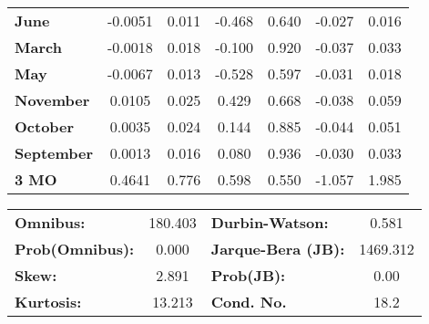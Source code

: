 \begin{center}
\begin{tabular}{lcccccc}
\textbf{June}      &      -0.0051  &        0.011     &    -0.468  &         0.640        &       -0.027    &        0.016     \\
\textbf{March}     &      -0.0018  &        0.018     &    -0.100  &         0.920        &       -0.037    &        0.033     \\
\textbf{May}       &      -0.0067  &        0.013     &    -0.528  &         0.597        &       -0.031    &        0.018     \\
\textbf{November}  &       0.0105  &        0.025     &     0.429  &         0.668        &       -0.038    &        0.059     \\
\textbf{October}   &       0.0035  &        0.024     &     0.144  &         0.885        &       -0.044    &        0.051     \\
\textbf{September} &       0.0013  &        0.016     &     0.080  &         0.936        &       -0.030    &        0.033     \\
\textbf{3 MO}      &       0.4641  &        0.776     &     0.598  &         0.550        &       -1.057    &        1.985     \\
\bottomrule
\end{tabular}
\begin{tabular}{lclc}
\textbf{Omnibus:}       & 180.403 & \textbf{  Durbin-Watson:     } &    0.581  \\
\textbf{Prob(Omnibus):} &   0.000 & \textbf{  Jarque-Bera (JB):  } & 1469.312  \\
\textbf{Skew:}          &   2.891 & \textbf{  Prob(JB):          } &     0.00  \\
\textbf{Kurtosis:}      &  13.213 & \textbf{  Cond. No.          } &     18.2  \\
\bottomrule
\end{tabular}
\end{center}

